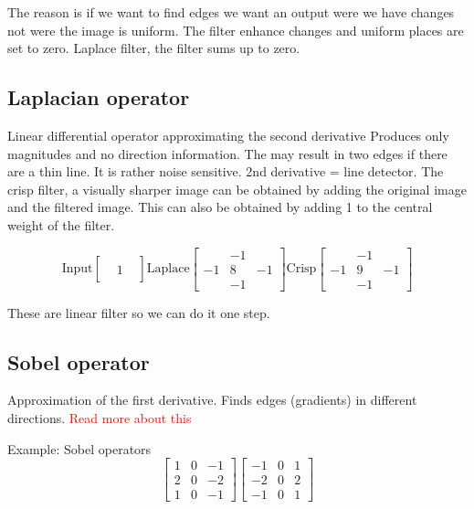 The reason is if we want to find edges we want an output were we have changes not were the image is uniform. The filter enhance changes and uniform places are set to zero. Laplace filter, the filter sums up to zero.  


\subsection*{Laplacian operator}
Linear differential operator approximating the second derivative Produces only magnitudes and no direction information. The may result in two edges if there are a thin line. It is rather noise sensitive. 2nd derivative = line detector. The crisp filter, a visually sharper image can be obtained by adding the original image and the filtered image. This can also be obtained by adding 1 to the central weight of the filter. 

\begin{equation}
\text{Input}
\begin{bmatrix} & & \\ &1 & \\ & &   \end{bmatrix}
\text{Laplace}
\begin{bmatrix} & -1& \\ -1&8 &-1 \\ & -1&   \end{bmatrix}
\text{Crisp}
\begin{bmatrix} & -1& \\ -1&9 &-1 \\ & -1&   \end{bmatrix}
\end{equation}

These are linear filter so we can do it one step. 

\subsection*{Sobel operator}
Approximation of the first derivative. Finds edges (gradients) in different directions. 
\textcolor{red}{Read more about this}

\begin{example}{Example: Sobel operators }
 \begin{equation}
\begin{bmatrix} 1& 0& -1\\ 2& 0& -2\\ 1& 0& -1  \end{bmatrix}
\begin{bmatrix} -1& 0& 1\\ -2& 0& 2\\ -1& 0& 1  \end{bmatrix}
 \end{equation}
\end{example}	

